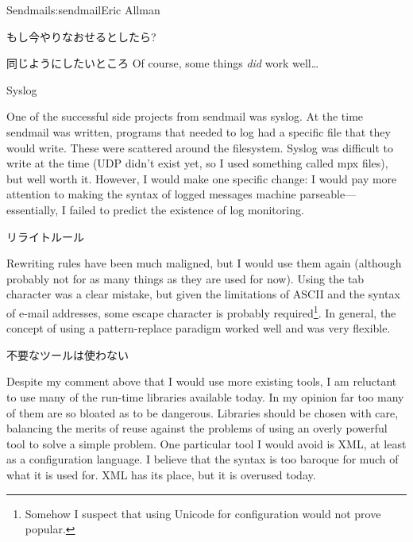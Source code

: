 \begin{aosachapter}{Sendmail}{s:sendmail}{Eric Allman}
\begin{aosasect1}{もし今やりなおせるとしたら?}
\begin{aosasect2}{同じようにしたいところ}
Of course, some things \emph{did} work well\ldots

\begin{aosasect3}{Syslog}

One of the successful side projects from sendmail was syslog. At the
time sendmail was written, programs that needed to log had a specific
file that they would write. These were scattered around the
filesystem.  Syslog was difficult to write at the time (UDP didn't
exist yet, so I used something called mpx files), but well worth
it. However, I would make one specific change: I would pay more
attention to making the syntax
of logged messages
machine parseable---essentially, I
failed to predict the existence of log monitoring.

\end{aosasect3}

\begin{aosasect3}{リライトルール}

Rewriting rules have been much maligned, but I would use them again
(although probably not for as many things as they are used for now).
Using the tab character was a clear mistake, but given the limitations
of ASCII and the syntax of e-mail addresses, some escape character is
probably required\footnote{Somehow I suspect that using Unicode for
configuration would not prove popular.}. In general, the concept of
using a pattern-replace paradigm worked well and was very flexible.

\end{aosasect3}

\begin{aosasect3}{不要なツールは使わない}

Despite my comment above that I would use more existing tools, I am
reluctant to use many of the run-time libraries available today. In my
opinion far too many of them are so bloated as to be dangerous.
Libraries should be chosen with care, balancing the merits of reuse
against the problems of using an overly powerful tool to solve a
simple problem. One particular tool I would avoid is XML, at least as
a configuration language. I believe that the syntax is too baroque for
much of what it is used for. XML has its place, but it is overused
today.

\end{aosasect3}


\end{aosasect2}
\end{aosasect1}
\end{aosachapter}
